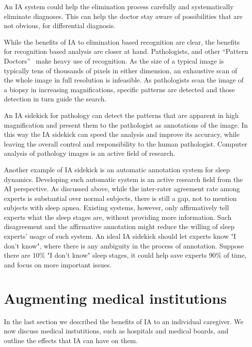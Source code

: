 \documentclass[11pt]{pnas-new}
\begin{document}
An IA system could help the elimination process carefully and
systematically eliminate diagnoses. This can help the doctor stay
aware of possibilities that are not obvious, for differential
diagnosis.

While the benefits of IA to elimination based recognition are clear,
the benefits for recognition based analysis are closer at hand.
Pathologists, and other ``Pattern Doctors''~\cite{Topol} make heavy
use of recognition. As the size of a typical image is typically tens
of thousands of pixels in either dimension, an exhaustive scan of the
whole image in full resolution is infeasible. As pathologists scan
the image of a biopsy in increasing magnifications,
specific patterns are detected and those detection in turn guide the search.


An IA sidekick for pathology can detect the patterns that are apparent
in high magnification and present them to the pathologist as
annotations of the image. In this way the IA sidekick can speed the
analysis and improve its accuracy, while leaving the overall control
and responsibility to the human pathologist. Computer analysis of
pathology images is an active field of research.\cite{}


{\color{red}Another example of IA sidekick is an automatic annotation system for sleep dynamics. Developing such automatic system is an active research field from the AI perspective. As discussed above, while the inter-rater agreement rate among experts is substantial over normal subjects, there is still a gap, not to mention subjects with sleep apnea. Existing systems, however, only affirmatively tell experts what the sleep stages are, without providing more information. Such disagreement and the affirmative annotation might reduce the willing of sleep experts' usage of such system. An ideal IA sidekick should let experts know "I don't know", where there is any ambiguity in the process of annotation. Suppose there are 10\% "I don't know" sleep stages, it could help save experts 90\% of time, and focus on more important issues.} 




\section{Augmenting medical institutions}

In the last section we described the benefits of IA to an individual
caregiver. We now discuss medical instutitions, such as hospitals and
medical boards, and outline the effects that IA can have on them.
\end{document}
